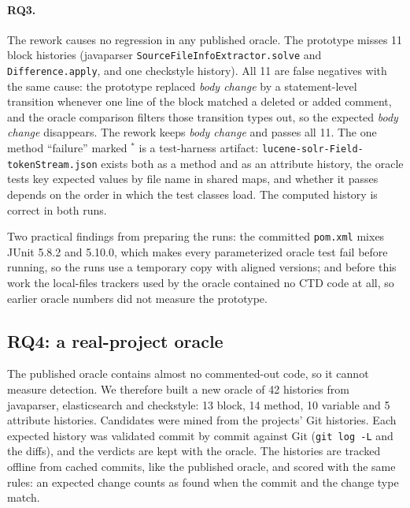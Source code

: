 \documentclass[11pt,a4paper]{article}
\newcommand{\code}[1]{\texttt{#1}}
\newcommand{\change}[1]{\textit{#1}}
\begin{document}
\paragraph{RQ3.} The rework causes no regression in any published oracle. The prototype misses 11 block histories (javaparser \code{SourceFileInfoExtractor.solve} and \code{Difference.apply}, and one checkstyle history). All 11 are false negatives with the same cause: the prototype replaced \change{body change} by a statement-level transition whenever one line of the block matched a deleted or added comment, and the oracle comparison filters those transition types out, so the expected \change{body change} disappears. The rework keeps \change{body change} and passes all 11. The one method ``failure'' marked $^{*}$ is a test-harness artifact: \code{lucene-solr-Field-tokenStream.json} exists both as a method and as an attribute history, the oracle tests key expected values by file name in shared maps, and whether it passes depends on the order in which the test classes load. The computed history is correct in both runs.

Two practical findings from preparing the runs: the committed \code{pom.xml} mixes JUnit 5.8.2 and 5.10.0, which makes every parameterized oracle test fail before running, so the runs use a temporary copy with aligned versions; and before this work the local-files trackers used by the oracle contained no CTD code at all, so earlier oracle numbers did not measure the prototype.

\subsection{RQ4: a real-project oracle}\label{sec:realoracle}
The published oracle contains almost no commented-out code, so it cannot measure detection. We therefore built a new oracle of 42 histories from javaparser, elasticsearch and checkstyle: 13 block, 14 method, 10 variable and 5 attribute histories. Candidates were mined from the projects' Git histories. Each expected history was validated commit by commit against Git (\code{git log -L} and the diffs), and the verdicts are kept with the oracle. The histories are tracked offline from cached commits, like the published oracle, and scored with the same rules: an expected change counts as found when the commit and the change type match.
\end{document}
